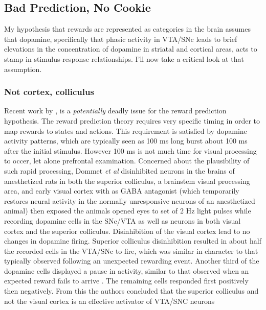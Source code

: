 \documentclass[doc,12pt]{apa}        %
\begin{document}
\subsection{Bad Prediction, No Cookie}
\label{sub:bad}
My hypothesis that rewards are represented as categories in the brain assumes that dopamine, specifically that phasic activity in VTA/SNc leads to brief elevations in the concentration of dopamine in striatal and cortical areas, acts to stamp in stimulus-response relationships.  I'll now take a critical look at that assumption.

\subsubsection{Not cortex, colliculus}
\label{subsub:colliculus}
Recent work by , is a \emph{potentially} deadly issue for the reward prediction hypothesis.  The reward prediction theory requires very specific timing in order to map rewards to states and actions.  This requirement is satisfied by dopamine activity patterns, which are typically seen as 100 ms long burst about 100 ms after the initial stimulus.  However 100 ms is not much time for visual processing to occer, let alone prefrontal examination.  Concerned about the plausibility of such rapid processing, Dommet \emph{et al} disinhibited neurons in the brains of anesthetized rats in both the superior colliculus, a brainstem visual processing area, and early visual cortex with as GABA antagonist (which temporarily restores neural activity in the normally unresponsive neurons of an anesthetized animal) then exposed the animals opened eyes to set of 2 Hz light pulses while recording dopamine cells in the SNc/VTA as well as neurons in both visual cortex and the superior colliculus.  Disinhibition of the visual cortex lead to no changes in dopamine firing.  Superior colliculus disinhibition resulted in about half the recorded cells in the VTA/SNc to fire, which was similar in character to that typically observed following an unexpected rewarding event.  Another third of the dopamine cells displayed a pause in activity, similar to that observed when an expected reward fails to arrive \cite{Mirenowicz:1994p7185}.  The remaining cells responded first positively then negatively.  From this the authors concluded that the superior colliculus and not the visual cortex is an effective activator of VTA/SNC neurons
\end{document}
